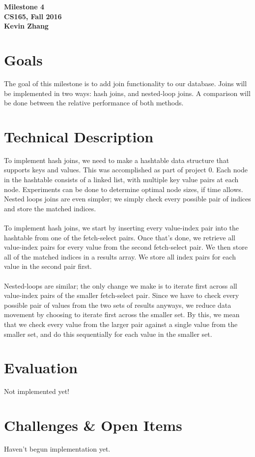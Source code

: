 \documentclass[12pt]{article}
\begin{document}
\begin{center}
\textbf{Milestone 4 \\ CS165, Fall 2016 \\ Kevin Zhang}
\end{center}

\section{Goals}
The goal of this milestone is to add join functionality to our database.  Joins will be implemented in two ways: hash joins, and nested-loop joins.  A comparison will be done between the relative performance of both methods.

\section{Technical Description}
To implement hash joins, we need to make a hashtable data structure that supports keys and values.  This was accomplished as part of project 0.  Each node in the hashtable consists of a linked list, with multiple key value pairs at each node.  Experiments can be done to determine optimal node sizes, if time allows.  Nested loops joins are even simpler; we simply check every possible pair of indices and store the matched indices.
\\\\To implement hash joins, we start by inserting every value-index pair into the hashtable from one of the fetch-select pairs.  Once that's done, we retrieve all value-index pairs for every value from the second fetch-select pair.  We then store all of the matched indices in a results array.  We store all index pairs for each value in the second pair first.
\\\\Nested-loops are similar; the only change we make is to iterate first across all value-index pairs of the smaller fetch-select pair.  Since we have to check every possible pair of values from the two sets of results anyways, we reduce data movement by choosing to iterate first across the smaller set.  By this, we mean that we check every value from the larger pair against a single value from the smaller set, and do this sequentially for each value in the smaller set.

\section{Evaluation}
Not implemented yet!

\section{Challenges \& Open Items}
Haven't begun implementation yet.
\end{document}
